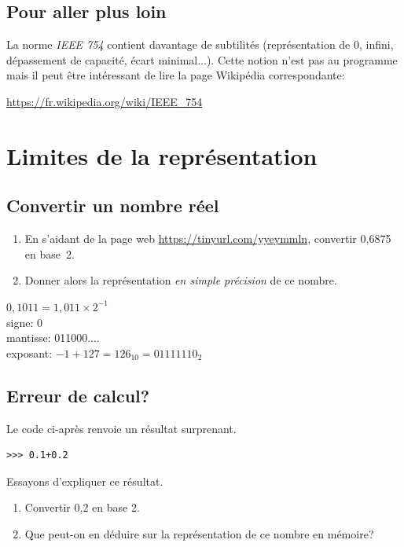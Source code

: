 \documentclass[a4paper,11pt]{article}
\begin{document}
\begin{Form}
\subsection{Pour aller plus loin}
La norme \emph{IEEE 754} contient davantage de subtilités (représentation de 0, infini, dépassement de capacité, écart minimal...). Cette notion n'est pas au programme mais il peut être intéressant de lire la page Wikipédia correspondante:
\begin{center}
\url{https://fr.wikipedia.org/wiki/IEEE_754}
\end{center} 
\section{Limites de la représentation}
\subsection{Convertir un nombre réel}
\begin{activite}
\begin{enumerate}
\item En s'aidant de la page web \url{https://tinyurl.com/yyeymmln}, convertir 0,6875 en base~2.
\item Donner alors la représentation \emph{en simple précision} de ce nombre.
\end{enumerate}
\begin{commentprof}
$0,1011=1,011×2^{-1}$\\signe: 0\\mantisse: 011000....\\exposant: $-1+127=126_{10}=01111110_2$
\end{commentprof}
\end{activite}
\subsection{Erreur de calcul?}
Le code ci-après renvoie un résultat surprenant.
\begin{lstlisting}
>>> 0.1+0.2
\end{lstlisting}
Essayons d'expliquer ce résultat.
\begin{activite}
\begin{enumerate}
\item Convertir 0,2 en base 2.
\item Que peut-on en déduire sur la représentation de ce nombre en mémoire?
\end{enumerate}
\end{activite}

\end{Form}
\end{document}

